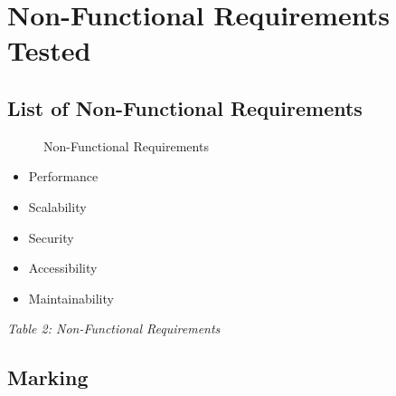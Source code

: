 \documentclass[12pt]{article}
\begin{document}
		


\section{Non-Functional Requirements Tested}
	\subsection{List of Non-Functional Requirements}

\begin{description}
	\item[] Non-Functional Requirements
\end{description}
\begin{itemize}
	
	\item Performance 
	\item Scalability 
	\item Security 
	\item Accessibility
	\item Maintainability
	
\end{itemize}

 \textit{Table 2: Non-Functional Requirements}

\subsection{Marking}
\end{document}
